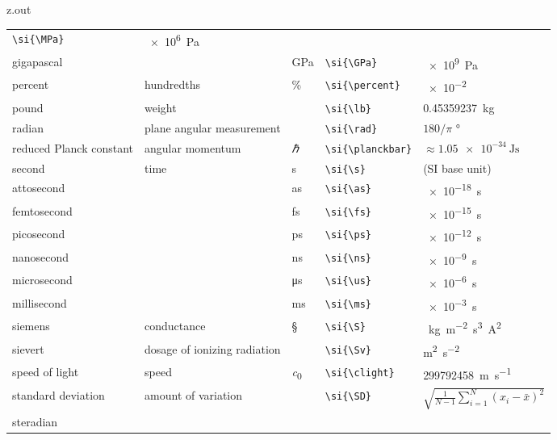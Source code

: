 \begin{VerbatimOut}{z.out}
{\begin{longtable}{@{}P{1.4in}P{1in}llP{1.8in}@{}}
      \verb+\si{\MPa}+&
      \SI{e6}{\Pa}\\
    \qquad gigapascal&
      \ditto&
      \si{\GPa}&
      \verb+\si{\GPa}+&
      \SI{e9}{\Pa}\\
    \vsp
    percent&
      hundredths&
      \si{\percent}&
      \verb+\si{\percent}+&
      \SI{e-2}{}\\
    \vsp
    pound&
      weight&
      \si{\lb}&
      \verb+\si{\lb}+&
      \SI{.45359237}{\kg}\\  %
    \vsp
    radian&
      plane angular measurement&
      \si{\rad}&
      \verb+\si{\rad}+&
      \(180/\pi\) \unit{\degree\nounit}\\
    \vsp
    reduced Planck constant&
      angular momentum&
      \si{\planckbar}&
      \verb+\si{\planckbar}+&
      \(\approx \SI{1.05e-34}{\J\s}\)\\
    \vsp
    second&
      time&
      \si{\s}&
      \verb+\si{\s}+&
      (SI base unit)\\
    \quad attosecond&
      \ditto&
      \si{\as}&
      \verb+\si{\as}+&
      \SI{e-18}{\s}\\
    \quad femtosecond&
      \ditto&
      \si{\fs}&
      \verb+\si{\fs}+&
      \SI{e-15}{\s}\\
    \quad picosecond&
      \ditto&
      \si{\ps}&
      \verb+\si{\ps}+&
      \SI{e-12}{\s}\\
    \quad nanosecond&
      \ditto&
      \si{\ns}&
      \verb+\si{\ns}+&
      \SI{e-9}{\s}\\
    \quad microsecond&
      \ditto&
      \si{\us}&
      \verb+\si{\us}+&
      \SI{e-6}{\s}\\
    \quad millisecond&
      \ditto&
      \si{\ms}&
      \verb+\si{\ms}+&
      \SI{e-3}{\s}\\
    \vsp
    siemens&
      conductance&
      \si{\S}&
      \verb+\si{\S}+&
      \si{\per\kg\per\m\squared\s\cubed\A\squared}\\
    \vsp
    sievert&
      dosage of ionizing radiation&
      \si{\Sv}&
      \verb+\si{\Sv}+&
      \si{\m\squared\per\s\squared}\\
    \vsp
    speed of light&
      speed&
      \si{\clight}&
      \verb+\si{\clight}+&
      \SI{299792458}{\m\per\s}\\
    \vsp
    standard deviation&
      amount of variation&
      \si{\SD}&
      \verb+\si{\SD}+&
      $\displaystyle \sqrt{\frac 1{N-1} \sum_{i=1}^N(x_i-\bar x)^2}$\\
    \vsp
    steradian&

\end{longtable}}
\end{VerbatimOut}
